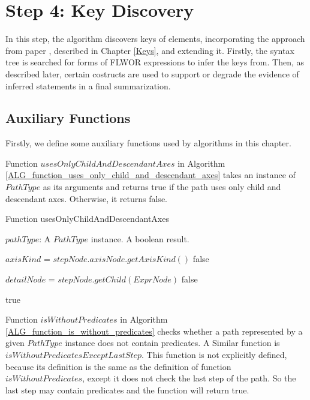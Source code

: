 
\section{Step 4: Key Discovery}
In this step, the algorithm discovers keys of elements, incorporating the approach from paper \cite{Necasky:2009:DXK:1529282.1529414}, described in Chapter \ref{Keys}, and extending it. Firstly, the syntax tree is searched for forms of FLWOR expressions to infer the keys from. Then, as described later, certain costructs are used to support or degrade the evidence of inferred statements in a final summarization.

\subsection{Auxiliary Functions} \label{step_4_auxiliary_functions}
Firstly, we define some auxiliary functions used by algorithms in this chapter.

Function $usesOnlyChildAndDescendantAxes$ in Algorithm \ref{ALG_function_uses_only_child_and_descendant_axes} takes an instance of $PathType$ as its arguments and returns true if the path uses only child and descendant axes. Otherwise, it returns false.

\begin{algorithm}
\caption{Function usesOnlyChildAndDescendantAxes}
\label{ALG_function_uses_only_child_and_descendant_axes}
\begin{algorithmic}[1]
\REQUIRE $pathType$: A $PathType$ instance.
\ENSURE A boolean result.

		\STATE $axisKind$ = $stepNode.axisNode.getAxisKind()$
			\RETURN false
		\ENDIF
	\ENDIF
\ENDFOR

\STATE $detailNode$ = $stepNode.getChild(ExprNode)$
			\RETURN false
		\ENDIF
	\ENDIF
\ENDIF

\RETURN true
\end{algorithmic}
\end{algorithm}

Function $isWithoutPredicates$ in Algorithm \ref{ALG_function_is_without_predicates} checks whether a path represented by a given $PathType$ instance does not contain predicates. A Similar function is  $isWithoutPredicatesExceptLastStep$. This function is not explicitly defined, because its definition is the same as the definition of function $isWithoutPredicates$, except it does not check the last step of the path. So the last step may contain predicates and the function will return true.


